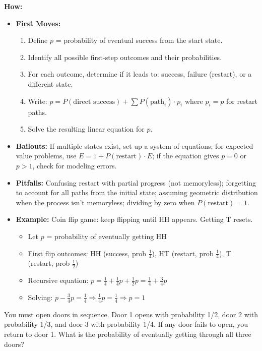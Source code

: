 \documentclass[12pt]{article}
\newenvironment{problem}[1]
{\begin{tcolorbox}[colback=blue!5!white,colframe=blue!75!black,title={#1}]}{\end{tcolorbox}}
\begin{document}
\textbf{How:}
\begin{itemize}
    \item \textbf{First Moves:}
    \begin{enumerate}[nosep]
        \item Define $p$ = probability of eventual success from the start state.
        \item Identify all possible first-step outcomes and their probabilities.
        \item For each outcome, determine if it leads to: success, failure (restart), or a different state.
        \item Write: $p = P(\text{direct success}) + \sum P(\text{path}_i) \cdot p_i$ where $p_i = p$ for restart paths.
        \item Solve the resulting linear equation for $p$.
    \end{enumerate}
    \item \textbf{Bailouts:} If multiple states exist, set up a system of equations; for expected value problems, use $E = 1 + P(\text{restart}) \cdot E$; if the equation gives $p = 0$ or $p > 1$, check for modeling errors.
    \item \textbf{Pitfalls:} Confusing restart with partial progress (not memoryless); forgetting to account for all paths from the initial state; assuming geometric distribution when the process isn't memoryless; dividing by zero when $P(\text{restart}) = 1$.
    \item \textbf{Example:} Coin flip game: keep flipping until HH appears. Getting T resets.
    \begin{itemize}
        \item Let $p$ = probability of eventually getting HH
        \item First flip outcomes: HH (success, prob $\frac{1}{4}$), HT (restart, prob $\frac{1}{4}$), T (restart, prob $\frac{1}{2}$)
        \item Recursive equation: $p = \frac{1}{4} + \frac{1}{4}p + \frac{1}{2}p = \frac{1}{4} + \frac{3}{4}p$
        \item Solving: $p - \frac{3}{4}p = \frac{1}{4} \Rightarrow \frac{1}{4}p = \frac{1}{4} \Rightarrow p = 1$
    \end{itemize}
\end{itemize}

\begin{problem}{Example: Three-Door Game}
You must open doors in sequence. Door 1 opens with probability 1/2, door 2 with probability 1/3, and door 3 with probability 1/4. If any door fails to open, you return to door 1. What is the probability of eventually getting through all three doors?
\end{problem}
\end{document}
